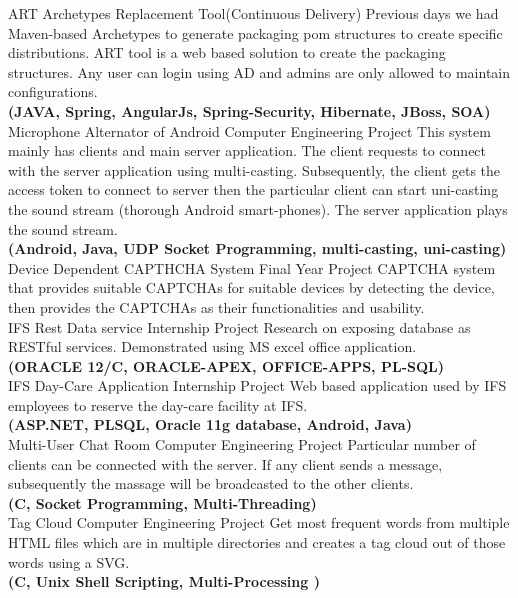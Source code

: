 \documentclass[]{cv-class}
\begin{document}
\begin{entrylist}
	\entry
    {}
	{ART}    
    {Archetypes Replacement Tool(Continuous Delivery)}
{Previous days we had Maven-based Archetypes to generate packaging pom structures to create specific distributions. ART tool is a web based solution to create the packaging structures. Any user can login using AD and admins are only allowed to maintain configurations.\\\textbf{(JAVA, Spring, AngularJs, Spring-Security, Hibernate, JBoss, SOA)}}
	\\
	\entry
    {}
    {Microphone Alternator of Android}
    {Computer Engineering Project}
    {This system mainly has clients and main server application. The client requests to connect with the server application using multi-casting. Subsequently, the client gets the access token to connect to server then the particular client can start uni-casting the sound stream (thorough Android smart-phones). The server application plays the sound stream. \\\textbf{(Android, Java, UDP Socket Programming, multi-casting, uni-casting)}}
    \\
	\entry
    {}
    {Device Dependent CAPTHCHA System}
    {Final Year Project}
    {CAPTCHA system that provides suitable CAPTCHAs for suitable devices by  detecting  the  device,  then  provides  the  CAPTCHAs  as  their functionalities and usability.}
	\\
  \entry
    {}
    {IFS Rest Data service}
    {Internship Project}
    {Research on exposing database as  RESTful  services. Demonstrated  using  MS  excel  office  application.\\\textbf{(ORACLE 12/C, ORACLE-APEX, OFFICE-APPS, PL-SQL)}}
	\\
  \entry
    {}
    {IFS Day-Care Application}
    {Internship Project}
    {Web  based  application  used  by  IFS  employees  to  reserve  the  day-care facility at IFS. \\\textbf{(ASP.NET, PLSQL, Oracle 11g database, Android, Java)}}
	\\  
  \entry
    {}
    {Multi-User Chat Room}
    {Computer Engineering Project}
    {Particular number of clients can be connected with the server. If any 
	client  sends  a  message, subsequently  the  massage  will be broadcasted to the other clients. 
	\\\textbf{(C, Socket Programming, Multi-Threading)}}
	\\
  \entry
    {}
    {Tag Cloud}
    {Computer Engineering Project}
    {Get most frequent words from multiple HTML files which are in 
	multiple directories and creates a tag cloud out of those words using a 
	SVG. \\\textbf{(C, Unix Shell Scripting, Multi-Processing )}}
\end{entrylist}
\end{document}
